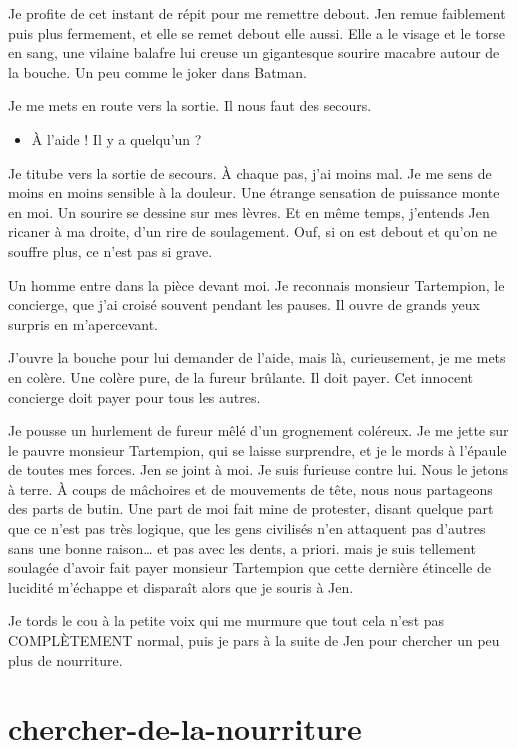 Je profite de cet instant de répit pour me remettre debout. Jen remue faiblement puis plus fermement, et elle se remet debout elle aussi. Elle a le visage et le torse en sang, une vilaine balafre lui creuse un gigantesque sourire macabre autour de la bouche. Un peu comme le joker dans Batman.

Je me mets en route vers la sortie. Il nous faut des secours.

\begin{itemize}
\item À l'aide ! Il y a quelqu'un ?
\end{itemize}

Je titube vers la sortie de secours. À chaque pas, j'ai moins mal. Je me sens de moins en moins sensible à la douleur. Une étrange sensation de puissance monte en moi. Un sourire se dessine sur mes lèvres. Et en même temps, j'entends Jen ricaner à ma droite, d'un rire de soulagement. Ouf, si on est debout et qu'on ne souffre plus, ce n'est pas si grave.

Un homme entre dans la pièce devant moi. Je reconnais monsieur Tartempion, le concierge, que j'ai croisé souvent pendant les pauses. Il ouvre de grands yeux surpris en m'apercevant.

J'ouvre la bouche pour lui demander de l'aide, mais là, curieusement, je me mets en colère. Une colère pure, de la fureur brûlante. Il doit payer. Cet innocent concierge doit payer pour tous les autres.

Je pousse un hurlement de fureur mêlé d'un grognement coléreux. Je me jette sur le pauvre monsieur Tartempion, qui se laisse surprendre, et je le mords à l'épaule de toutes mes forces. Jen se joint à moi. Je suis furieuse contre lui. Nous le jetons à terre. À coups de mâchoires et de mouvements de tête, nous nous partageons des parts de butin. Une part de moi fait mine de protester, disant quelque part que ce n'est pas très logique, que les gens civilisés n'en attaquent pas d'autres sans une bonne raison… et pas avec les dents, a priori. mais je suis tellement soulagée d'avoir fait payer monsieur Tartempion que cette dernière étincelle de lucidité m'échappe et disparaît alors que je souris à Jen.

Je tords le cou à la petite voix qui me murmure que tout cela n'est pas COMPLÈTEMENT normal, puis je pars à la suite de Jen pour chercher un peu plus de nourriture.


\section{chercher-de-la-nourriture}

